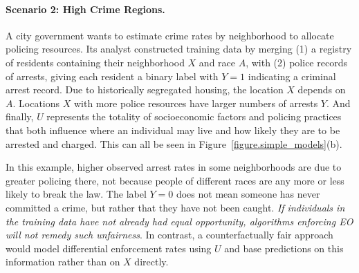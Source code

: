 \paragraph{Scenario 2: High Crime Regions.}
A city government wants to estimate crime rates by neighborhood to
allocate policing resources. Its analyst constructed training data by
merging (1) a registry of residents containing their neighborhood $X$
and race $A$, with (2) police records of arrests, giving each resident
a binary label with $Y = 1$ indicating a criminal arrest record.  Due
to historically segregated housing, the location $X$ depends on $A$.
Locations $X$ with more police resources have larger numbers of
arrests $Y$.  And finally, $U$ represents the totality of
socioeconomic factors and policing practices that both influence where
an individual may live and how likely they are to be arrested and
charged.  This can all be seen in
Figure~\ref{figure.simple_models}(b).

In this example, higher observed arrest rates in some neighborhoods
are due to greater policing there, not because people of different
races are any more or less likely to break the law.  The label $Y = 0$
does not mean someone has never committed a crime, but rather that
they have not been caught.  {\em If individuals in the training data
  have not already had equal opportunity, algorithms enforcing EO will
  not remedy such unfairness}.  In contrast, a counterfactually fair
approach would model differential enforcement rates using $U$ and base
predictions on this information rather than on $X$ directly.

